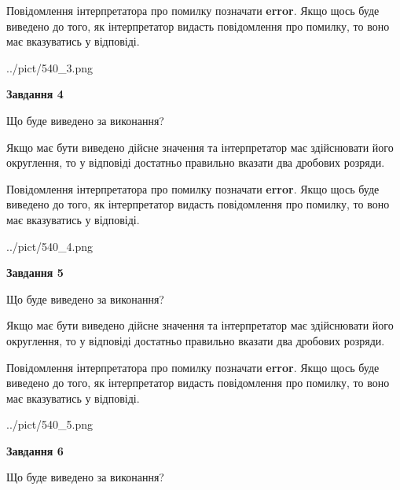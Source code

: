 \documentclass[12pt, ukrainian]{article}
\begin{document}
{\begin {Large}
Повідомлення інтерпретатора про помилку позначати \textbf{error}.
Якщо щось буде виведено до того, як інтерпретатор видасть повідомлення про помилку, 
то воно має вказуватись у відповіді. \par

\begin{center}
	{../pict/540_3.png}
\end{center}
\newpage

{\begin {center}\textbf{Завдання 4}\end {center}}\par
Що буде виведено за виконання? \par

Якщо має бути виведено дійсне значення та інтерпретатор має здійснювати його округлення, 
то у відповіді достатньо правильно вказати два дробових розряди.

Повідомлення інтерпретатора про помилку позначати \textbf{error}.
Якщо щось буде виведено до того, як інтерпретатор видасть повідомлення про помилку, 
то воно має вказуватись у відповіді. \par

\begin{center}
	{../pict/540_4.png}
\end{center}
\newpage

{\begin {center}\textbf{Завдання 5}\end {center}}\par
Що буде виведено за виконання? \par

Якщо має бути виведено дійсне значення та інтерпретатор має здійснювати його округлення, 
то у відповіді достатньо правильно вказати два дробових розряди.

Повідомлення інтерпретатора про помилку позначати \textbf{error}.
Якщо щось буде виведено до того, як інтерпретатор видасть повідомлення про помилку, 
то воно має вказуватись у відповіді. \par

\begin{center}
	{../pict/540_5.png}
\end{center}
\newpage

{\begin {center}\textbf{Завдання 6}\end {center}}\par
Що буде виведено за виконання? \par


\end{Large}}
\end{document}
